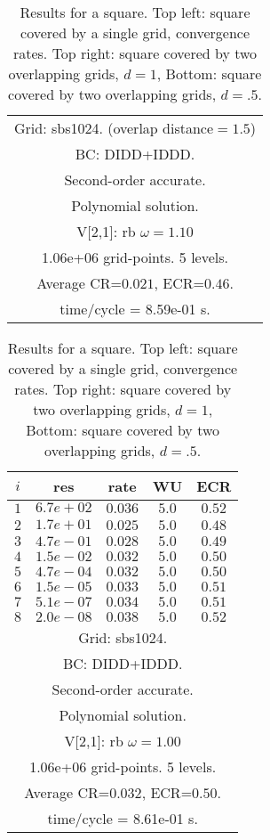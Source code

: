 \begin{table}[hbt]
\begin{center}
{\begin{tabular}{|c|c|c|c|c|}
\hline 
\multicolumn{5}{|c|}{Grid: sbs1024. (overlap distance$=1.5$)}  \\
\multicolumn{5}{|c|}{BC: DIDD+IDDD.}  \\
\multicolumn{5}{|c|}{Second-order accurate.}  \\
\multicolumn{5}{|c|}{Polynomial solution.}  \\
\multicolumn{5}{|c|}{V[2,1]: rb $\omega=1.10$}  \\
\multicolumn{5}{|c|}{1.06e+06 grid-points. 5 levels.}  \\
\multicolumn{5}{|c|}{Average CR=$0.021$, ECR=$0.46$.}  \\
\multicolumn{5}{|c|}{time/cycle = 8.59e-01 s.}  \\
\hline 
\end{tabular}
\qquad %
\begin{tabular}{|c|c|c|c|c|} \hline 
 $i$   & res      & rate    &  WU    & ECR  \\   \hline 
 $ 1$  & $ 6.7e+02$ & $0.036$ & $ 5.0$ & $0.52$ \\ 
 $ 2$  & $ 1.7e+01$ & $0.025$ & $ 5.0$ & $0.48$ \\ 
 $ 3$  & $ 4.7e-01$ & $0.028$ & $ 5.0$ & $0.49$ \\ 
 $ 4$  & $ 1.5e-02$ & $0.032$ & $ 5.0$ & $0.50$ \\ 
 $ 5$  & $ 4.7e-04$ & $0.032$ & $ 5.0$ & $0.50$ \\ 
 $ 6$  & $ 1.5e-05$ & $0.033$ & $ 5.0$ & $0.51$ \\ 
 $ 7$  & $ 5.1e-07$ & $0.034$ & $ 5.0$ & $0.51$ \\ 
 $ 8$  & $ 2.0e-08$ & $0.038$ & $ 5.0$ & $0.52$ \\ 
\hline 
\multicolumn{5}{|c|}{Grid: sbs1024.}  \\
\multicolumn{5}{|c|}{BC: DIDD+IDDD.}  \\
\multicolumn{5}{|c|}{Second-order accurate.}  \\
\multicolumn{5}{|c|}{Polynomial solution.}  \\
\multicolumn{5}{|c|}{V[2,1]: rb $\omega=1.00$}  \\
\multicolumn{5}{|c|}{1.06e+06 grid-points. 5 levels.}  \\
\multicolumn{5}{|c|}{Average CR=$0.032$, ECR=$0.50$.}  \\
\multicolumn{5}{|c|}{time/cycle = 8.61e-01 s.}  \\
\hline 
\end{tabular}
}\end{center}
\caption{Results for a square. Top left: square covered by a single grid, convergence rates. 
   Top right: square covered by two overlapping grids, $d=1$, Bottom: square covered by two overlapping grids, $d=.5$. }
\label{tab:overlap} 
\end{table}
